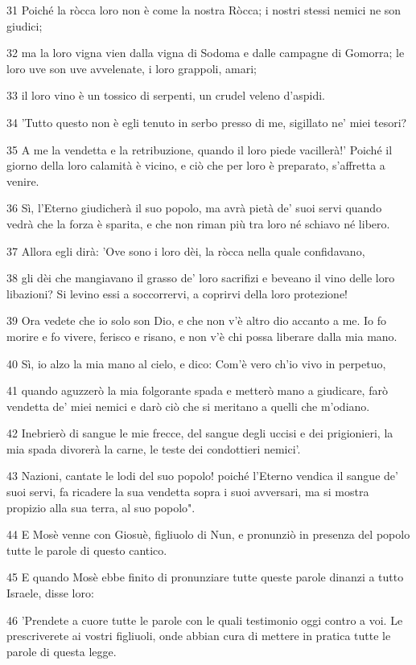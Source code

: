 \par 31 Poiché la ròcca loro non è come la nostra Ròcca; i nostri stessi nemici ne son giudici;
\par 32 ma la loro vigna vien dalla vigna di Sodoma e dalle campagne di Gomorra; le loro uve son uve avvelenate, i loro grappoli, amari;
\par 33 il loro vino è un tossico di serpenti, un crudel veleno d'aspidi.
\par 34 'Tutto questo non è egli tenuto in serbo presso di me, sigillato ne' miei tesori?
\par 35 A me la vendetta e la retribuzione, quando il loro piede vacillerà!' Poiché il giorno della loro calamità è vicino, e ciò che per loro è preparato, s'affretta a venire.
\par 36 Sì, l'Eterno giudicherà il suo popolo, ma avrà pietà de' suoi servi quando vedrà che la forza è sparita, e che non riman più tra loro né schiavo né libero.
\par 37 Allora egli dirà: 'Ove sono i loro dèi, la ròcca nella quale confidavano,
\par 38 gli dèi che mangiavano il grasso de' loro sacrifizi e beveano il vino delle loro libazioni? Si levino essi a soccorrervi, a coprirvi della loro protezione!
\par 39 Ora vedete che io solo son Dio, e che non v'è altro dio accanto a me. Io fo morire e fo vivere, ferisco e risano, e non v'è chi possa liberare dalla mia mano.
\par 40 Sì, io alzo la mia mano al cielo, e dico: Com'è vero ch'io vivo in perpetuo,
\par 41 quando aguzzerò la mia folgorante spada e metterò mano a giudicare, farò vendetta de' miei nemici e darò ciò che si meritano a quelli che m'odiano.
\par 42 Inebrierò di sangue le mie frecce, del sangue degli uccisi e dei prigionieri, la mia spada divorerà la carne, le teste dei condottieri nemici'.
\par 43 Nazioni, cantate le lodi del suo popolo! poiché l'Eterno vendica il sangue de' suoi servi, fa ricadere la sua vendetta sopra i suoi avversari, ma si mostra propizio alla sua terra, al suo popolo".
\par 44 E Mosè venne con Giosuè, figliuolo di Nun, e pronunziò in presenza del popolo tutte le parole di questo cantico.
\par 45 E quando Mosè ebbe finito di pronunziare tutte queste parole dinanzi a tutto Israele, disse loro:
\par 46 'Prendete a cuore tutte le parole con le quali testimonio oggi contro a voi. Le prescriverete ai vostri figliuoli, onde abbian cura di mettere in pratica tutte le parole di questa legge.
